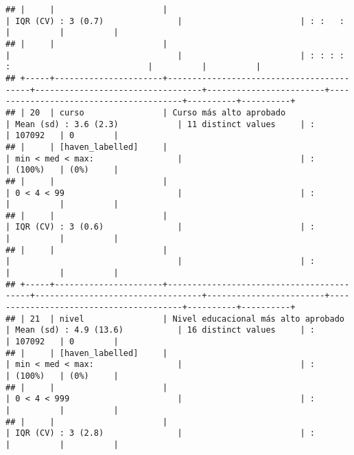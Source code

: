 \documentclass[]{article}
\begin{document}
\begin{verbatim}
## |     |                      |                                          | IQR (CV) : 3 (0.7)               |                        | : :   :                                |          |          |
## |     |                      |                                          |                                  |                        | : : : :   :                            |          |          |
## +-----+----------------------+------------------------------------------+----------------------------------+------------------------+----------------------------------------+----------+----------+
## | 20  | curso                | Curso más alto aprobado                  | Mean (sd) : 3.6 (2.3)            | 11 distinct values     | :                                      | 107092   | 0        |
## |     | [haven_labelled]     |                                          | min < med < max:                 |                        | :                                      | (100%)   | (0%)     |
## |     |                      |                                          | 0 < 4 < 99                       |                        | :                                      |          |          |
## |     |                      |                                          | IQR (CV) : 3 (0.6)               |                        | :                                      |          |          |
## |     |                      |                                          |                                  |                        | :                                      |          |          |
## +-----+----------------------+------------------------------------------+----------------------------------+------------------------+----------------------------------------+----------+----------+
## | 21  | nivel                | Nivel educacional más alto aprobado      | Mean (sd) : 4.9 (13.6)           | 16 distinct values     | :                                      | 107092   | 0        |
## |     | [haven_labelled]     |                                          | min < med < max:                 |                        | :                                      | (100%)   | (0%)     |
## |     |                      |                                          | 0 < 4 < 999                      |                        | :                                      |          |          |
## |     |                      |                                          | IQR (CV) : 3 (2.8)               |                        | :                                      |          |          |

\end{verbatim}
\end{document}
